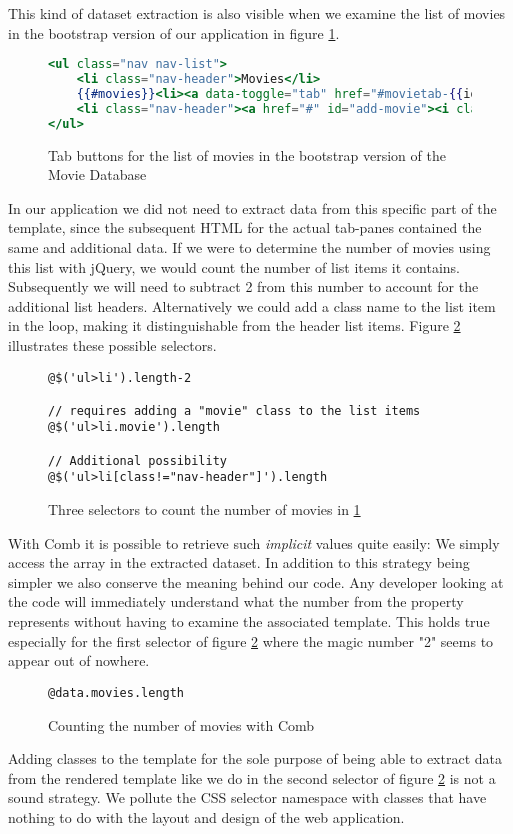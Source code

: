 \documentclass[thesis.tex]{subfiles}
\begin{document}
This kind of dataset extraction is also visible when we examine the list of
movies in the bootstrap version of our application in figure
\ref{fig:movielist.mustache}.
\begin{figure}
	\centering
	\begin{lstlisting}[language=mustache]
<ul class="nav nav-list">
	<li class="nav-header">Movies</li>
	{{#movies}}<li><a data-toggle="tab" href="#movietab-{{id}}">{{title}}</a></li>{{/movies}}
	<li class="nav-header"><a href="#" id="add-movie"><i class="icon-plus"></i></a></li>
</ul>
	\end{lstlisting}
	\caption{Tab buttons for the list of movies in the bootstrap version of the Movie Database}
	\label{fig:movielist.mustache}
\end{figure}
In our application we did not need to extract data
from this specific part of the template, since the subsequent HTML for the
actual tab-panes contained the same and additional data.
If we were to determine the number of movies using this list with jQuery,
we would count the number of list items it contains. Subsequently we will need
to subtract 2 from this number to account for the additional list headers.
Alternatively we could add a class name to the list item in the
 loop, making it distinguishable from the header list
items.
Figure \ref{fig:movielist-jquery.js} illustrates these possible selectors.
\begin{figure}
	\centering
	\begin{lstlisting}
@$('ul>li').length-2

// requires adding a "movie" class to the list items
@$('ul>li.movie').length

// Additional possibility
@$('ul>li[class!="nav-header"]').length
	\end{lstlisting}
	\caption{Three selectors to count the number of movies in \ref{fig:movielist.mustache}}
	\label{fig:movielist-jquery.js}
\end{figure}

With Comb it is possible to retrieve such \emph{implicit} values quite easily:
We simply access the  array in the extracted dataset.
In addition to this strategy being simpler we also conserve the meaning behind
our code. Any developer looking at the code will immediately understand what
the number from the  property represents without having to
examine the associated template. This holds true especially for the first
selector of figure \ref{fig:movielist-jquery.js} where the magic number "2"
seems to appear out of nowhere.
\begin{figure}
	\centering
	\begin{lstlisting}
@data.movies.length
	\end{lstlisting}
	\caption{Counting the number of movies with Comb}
	\label{fig:movielist-comb.js}
\end{figure}
Adding classes to the template for the sole purpose of being able to extract
data from the rendered template like we do in the second selector of figure
\ref{fig:movielist-jquery.js} is not a sound strategy. We pollute the CSS
selector namespace with classes that have nothing to do with the layout and
design of the web application.
\end{document}
